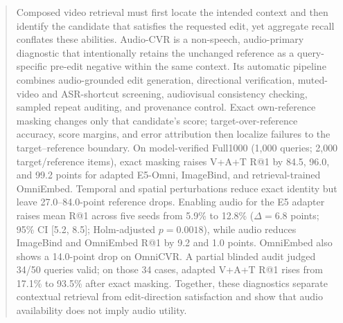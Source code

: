 \begin{abstract}
Composed video retrieval must first locate the intended context and then identify the candidate that satisfies the requested edit, yet aggregate recall conflates these abilities.
Audio-CVR is a non-speech, audio-primary diagnostic that intentionally retains the unchanged reference as a query-specific pre-edit negative within the same context.
Its automatic pipeline combines audio-grounded edit generation, directional verification, muted-video and ASR-shortcut screening, audiovisual consistency checking, sampled repeat auditing, and provenance control.
Exact own-reference masking changes only that candidate's score; target-over-reference accuracy, score margins, and error attribution then localize failures to the target--reference boundary.
On model-verified Full1000 (1,000 queries; 2,000 target/reference items), exact masking raises V+A+T R@1 by 84.5, 96.0, and 99.2 points for adapted E5-Omni, ImageBind, and retrieval-trained OmniEmbed. Temporal and spatial perturbations reduce exact identity but leave 27.0--84.0-point reference drops. Enabling audio for the E5 adapter raises mean R@1 across five seeds from 5.9\% to 12.8\% ($\Delta=6.8$ points; 95\% CI [5.2, 8.5]; Holm-adjusted $p=0.0018$), while audio reduces ImageBind and OmniEmbed R@1 by 9.2 and 1.0 points. OmniEmbed also shows a 14.0-point drop on OmniCVR. A partial blinded audit judged 34/50 queries valid; on those 34 cases, adapted V+A+T R@1 rises from 17.1\% to 93.5\% after exact masking.
Together, these diagnostics separate contextual retrieval from edit-direction satisfaction and show that audio availability does not imply audio utility.
\end{abstract}

